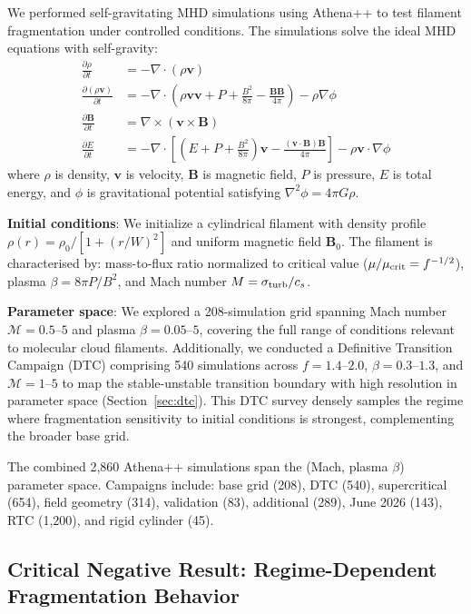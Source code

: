 \documentclass[twocolumn]{mnras}
\begin{document}
We performed self-gravitating MHD simulations using Athena++ \citep{Stone2020} to test filament fragmentation under controlled conditions. The simulations solve the ideal MHD equations with self-gravity:
\begin{align}
\frac{\partial \rho}{\partial t} &= -\nabla \cdot (\rho \mathbf{v}) \\
\frac{\partial (\rho \mathbf{v})}{\partial t} &= -\nabla \cdot \left(\rho \mathbf{v} \mathbf{v} + P + \frac{B^2}{8\pi} - \frac{\mathbf{B}\mathbf{B}}{4\pi}\right) - \rho \nabla \phi \\
\frac{\partial \mathbf{B}}{\partial t} &= \nabla \times (\mathbf{v} \times \mathbf{B}) \\
\frac{\partial E}{\partial t} &= -\nabla \cdot \left[(E + P + \frac{B^2}{8\pi})\mathbf{v} - \frac{(\mathbf{v} \cdot \mathbf{B})\mathbf{B}}{4\pi}\right] - \rho \mathbf{v} \cdot \nabla \phi
\end{align}
where $\rho$ is density, $\mathbf{v}$ is velocity, $\mathbf{B}$ is magnetic field, $P$ is pressure, $E$ is total energy, and $\phi$ is gravitational potential satisfying $\nabla^2 \phi = 4\pi G\rho$.

\textbf{Initial conditions}: We initialize a cylindrical filament with density profile $\rho(r) = \rho_0 / [1 + (r/W)^2]$ and uniform magnetic field $\mathbf{B}_0$. The filament is characterised by: mass-to-flux ratio normalized to critical value ($\mu/\mu_{\rm crit} = f^{-1/2}$), plasma $\beta = 8\pi P/B^2$, and Mach number $M = \sigma_{\rm turb}/c_s$.

\textbf{Parameter space}: We explored a 208-simulation grid spanning Mach number $\mathcal{M} = 0.5$--$5$ and plasma $\beta = 0.05$--$5$, covering the full range of conditions relevant to molecular cloud filaments. Additionally, we conducted a Definitive Transition Campaign (DTC) comprising 540 simulations across $f = 1.4$--$2.0$, $\beta = 0.3$--$1.3$, and $\mathcal{M} = 1$--$5$ to map the stable-unstable transition boundary with high resolution in parameter space (Section~\ref{sec:dtc}). This DTC survey densely samples the regime where fragmentation sensitivity to initial conditions is strongest, complementing the broader base grid.

The combined 2,860 Athena++ simulations span the (Mach, plasma $\beta$) parameter space. Campaigns include: base grid (208), DTC (540), supercritical (654), field geometry (314), validation (83), additional (289), June 2026 (143), RTC (1,200), and rigid cylinder (45).

\subsection{Critical Negative Result: Regime-Dependent Fragmentation Behavior}
\label{sec:supercrit_negative}
\end{document}
